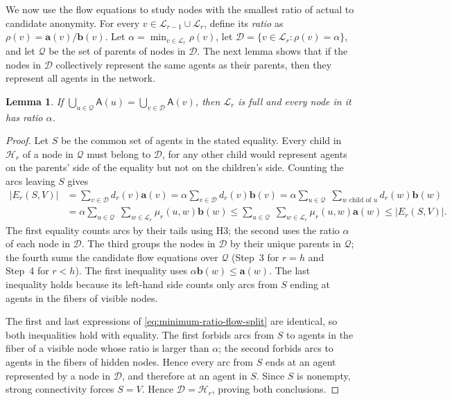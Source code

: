 \documentclass[11pt]{article}
\newcommand{\anon}{\mathbf a}
\newcommand{\cand}{\mathbf b}
\newcommand{\agents}{\mathsf A}
\newtheorem{lemma}{Lemma}
\begin{document}
We now use the flow equations to study nodes with the smallest ratio
of actual to candidate anonymity.  For every
\(v\in\mathcal L_{r-1}\cup\mathcal L_r\), define its \emph{ratio} as
\(\rho(v)=\anon(v)/\cand(v)\).  Let
\(\alpha=\min_{v\in\mathcal L_r}\rho(v)\), let
\(\mathcal D=\{v\in\mathcal L_r:\rho(v)=\alpha\}\), and let
\(\mathcal Q\) be the set of parents of nodes in \(\mathcal D\).
The next lemma shows that if the nodes in \(\mathcal D\) collectively
represent the same agents as their parents, then they represent all
agents in the network.

\begin{lemma}
\label{lem:minimum-ratio-closure-split}
If \(\bigcup_{u\in\mathcal Q}\agents(u)
=\bigcup_{v\in\mathcal D}\agents(v)\),
then \(\mathcal L_r\) is full and every node in it has ratio
\(\alpha\).
\end{lemma}

\begin{proof}
Let \(S\) be the common set of agents in the stated equality.
Every child in \(\mathcal H_r\) of a node in \(\mathcal Q\) must
belong to \(\mathcal D\), for any other child would represent agents
on the parents' side of the
equality but not on the children's side.
Counting the arcs leaving \(S\) gives
\begin{equation}
\label{eq:minimum-ratio-flow-split}
 \begin{aligned}
 |E_r(S,V)|
 &=\sum_{v\in\mathcal D}d_r(v)\anon(v)
 =\alpha\sum_{v\in\mathcal D}d_r(v)\cand(v)
 =\alpha\sum_{u\in\mathcal Q}\;\sum_{w\text{ child of }u} d_r(w)\cand(w)\\
 &=\alpha\sum_{u\in\mathcal Q}\;\sum_{w\in\mathcal L_r}
       \mu_r(u,w)\cand(w)
 \leq\sum_{u\in\mathcal Q}\;\sum_{w\in\mathcal L_r}
       \mu_r(u,w)\anon(w)
 \leq |E_r(S,V)|.
 \end{aligned}
\end{equation}
The first equality counts arcs by their tails using H3;
the second uses the ratio \(\alpha\) of each node in \(\mathcal D\).
The third groups the nodes in \(\mathcal D\) by their unique parents
in \(\mathcal Q\); the fourth sums the candidate flow equations
over \(\mathcal Q\) (Step~3 for $r=h$ and Step~4 for $r<h$).
The first inequality uses \(\alpha\cand(w)\leq\anon(w)\).
The last inequality holds because its left-hand side counts only
arcs from \(S\) ending at agents in the fibers of visible nodes.

The first and last expressions of \eqref{eq:minimum-ratio-flow-split} are identical,
so both inequalities hold with equality.
The first forbids arcs from \(S\) to agents in the fiber of a visible
node whose ratio is larger than \(\alpha\); the second forbids arcs
to agents in the fibers of hidden nodes.
Hence every arc from \(S\) ends at an agent represented by a node
in \(\mathcal D\), and therefore at an agent in \(S\).
Since \(S\) is nonempty, strong connectivity forces \(S=V\).
Hence \(\mathcal D=\mathcal H_r\), proving both conclusions.
\end{proof}
\end{document}
